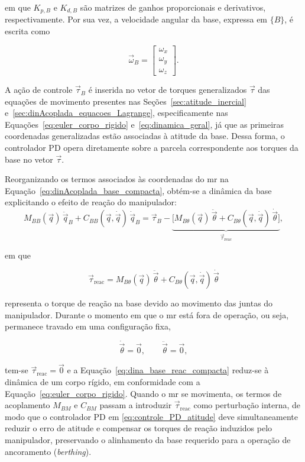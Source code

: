 em que \(K_{p,B}\) e \(K_{d,B}\) são matrizes de ganhos proporcionais e derivativos, respectivamente.
Por sua vez, a velocidade angular da base, expressa em $\{B\}$, é escrita como

\begin{equation}
\vec\omega_B =
\begin{bmatrix}
\omega_x \\
\omega_y \\
\omega_z
\end{bmatrix}.
\end{equation}

A ação de controle $\vec\tau_B$ é inserida no vetor de torques generalizados $\vec\tau$ das equações de movimento presentes nas Seções~\ref{sec:atitude_inercial} e~\ref{sec:dinAcoplada_equacoes_Lagrange}, especificamente nas Equações~\eqref{eq:euler_corpo_rigido} e~\eqref{eq:dinamica_geral}, já que as primeiras coordenadas generalizadas estão associadas à atitude da base.
Dessa forma, o controlador PD opera diretamente sobre a parcela correspondente aos torques da base no vetor $\vec\tau$.

Reorganizando os termos associados às coordenadas do \gls{mr} na Equação~\eqref{eq:dinAcoplada_base_compacta}, obtém-se a dinâmica da base explicitando o efeito de reação do manipulador:
\begin{equation}
M_{BB}(\vec q)\,\ddot{\vec q}_B
+
C_{BB}(\vec q,\dot{\vec q})\,\dot{\vec q}_B
=
\vec\tau_B
-
\underbrace{\bigl[
M_{B\theta}(\vec q)\,\ddot{\vec\theta}
+
C_{B\theta}(\vec q,\dot{\vec q})\,\dot{\vec\theta}
\bigr]}_{\displaystyle \vec\tau_{\text{reac}}},
\label{eq:dina_base_reac_compacta}
\end{equation}

em que

\begin{equation}
\vec\tau_{\text{reac}}
=
M_{B\theta}(\vec q)\,\ddot{\vec\theta}
+
C_{B\theta}(\vec q,\dot{\vec q})\,\dot{\vec\theta}
\label{eq:def_tau_reac}
\end{equation}

representa o torque de reação na base devido ao movimento das juntas do manipulador.
Durante o momento em que o \gls{mr} está fora de operação, ou seja, permanece travado em uma configuração fixa,

\begin{equation}
\dot{\vec\theta} = \vec 0,
\qquad
\ddot{\vec\theta} = \vec 0,
\end{equation}

tem-se $\vec\tau_{\text{reac}} = \vec 0$ e a Equação~\eqref{eq:dina_base_reac_compacta} reduz-se à dinâmica de um corpo rígido, em conformidade com a Equação~\eqref{eq:euler_corpo_rigido}.
Quando o \gls{mr} se movimenta, os termos de acoplamento $M_{BM}$ e $C_{BM}$ passam a introduzir $\vec\tau_{\text{reac}}$ como perturbação interna, de modo que o controlador PD em \eqref{eq:controle_PD_atitude} deve simultaneamente reduzir o erro de atitude e compensar os torques de reação induzidos pelo manipulador, preservando o alinhamento da base requerido para a operação de ancoramento (\emph{berthing}).